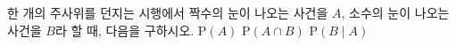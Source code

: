 한 개의 주사위를 던지는 시행에서 짝수의 눈이 나오는 사건을 $A$, 소수의 눈이 나오는 사건을 $B$라 할 때, 다음을 구하시오.
 $\mathrm{P}(A)$
 $\mathrm{P}(A\cap B)$
 $\mathrm{P}(B\mid A)$
